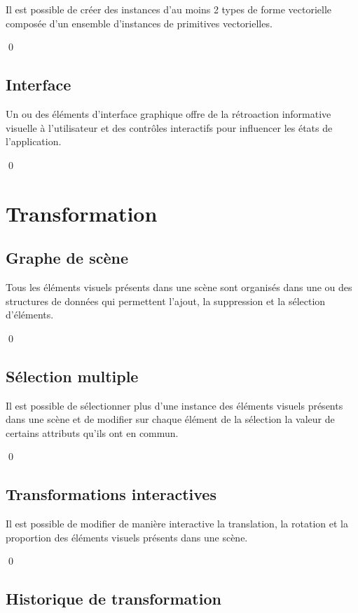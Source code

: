 \documentclass[12pt]{article}
\newcommand{\state}{\noindent}
\begin{document}
\state
Il est possible de créer des instances d'au moins 2 types de forme vectorielle composée d'un ensemble d'instances de primitives vectorielles.

\qed

\subsection{Interface}

\state
Un ou des éléments d'interface graphique offre de la rétroaction informative visuelle à l'utilisateur et des contrôles interactifs pour influencer les états de l'application.

\qed

\pagebreak

\section{Transformation}

\subsection{Graphe de scène}

\state
Tous les éléments visuels présents dans une scène sont organisés dans une ou des structures de données qui permettent l'ajout, la suppression et la sélection d'éléments.

\qed

\subsection{Sélection multiple}

\state
Il est possible de sélectionner plus d'une instance des éléments visuels
présents dans une scène et de modifier sur chaque élément de la sélection la valeur de certains attributs qu'ils ont en commun.

\qed

\subsection{Transformations interactives}

\state
Il est possible de modifier de manière interactive la translation, la rotation
et la proportion des éléments visuels présents dans une scène.

\qed


\subsection{Historique de transformation}
\end{document}
